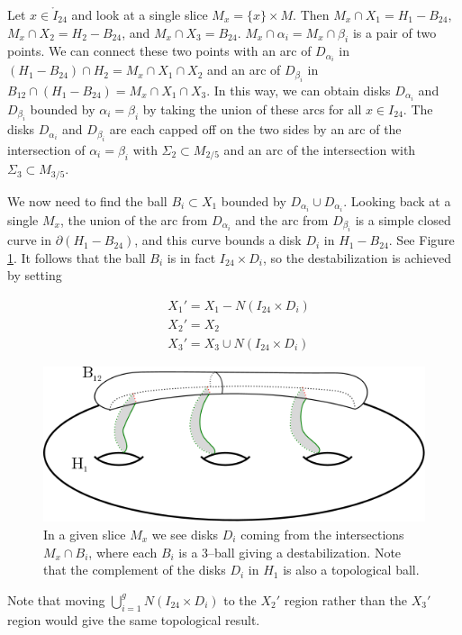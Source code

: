 \documentclass[12pt]{amsart}
\newcommand{\del}{\partial }
\theoremstyle{definition}
\theoremstyle{remark}
\begin{document}
Let $x \in \mathring I_{24}$ and look at a single slice $M_x = \{x\} \times M$.
Then $M_x \cap X_1 = H_1 - B_{24}$, $M_x \cap X_2 = H_2 - B_{24}$, and $M_x \cap X_3 = B_{24}$.
$M_x \cap \alpha_i = M_x \cap \beta_i$ is a pair of two points.
We can connect these two points with an arc of $D_{\alpha_i}$ in $(H_1 - B_{24}) \cap H_2 = M_x \cap X_1 \cap X_2$ and an arc of $D_{\beta_i}$ in $B_{12} \cap (H_1 - B_{24}) = M_x \cap X_1 \cap X_3$.
In this way, we can obtain disks $D_{\alpha_i}$ and $D_{\beta_i}$ bounded by $\alpha_i = \beta_i$ by taking the union of these arcs for all $x \in I_{24}$.
The disks $D_{\alpha_i}$ and $D_{\beta_i}$ are each capped off on the two sides by an arc of the intersection of $\alpha_i = \beta_i$ with $\Sigma_2 \subset M_{2/5}$ and an arc of the intersection with $\Sigma_3 \subset M_{3/5}$.

We now need to find the ball $B_i \subset X_1$ bounded by $D_{\alpha_i} \cup D_{\alpha_i}$.
Looking back at a single $M_x$, the union of the arc from $D_{\alpha_i}$ and the arc from $D_{\beta_i}$ is a simple closed curve in $\del (H_1 - B_{24})$, and this curve bounds a disk $D_i$ in $H_1 - B_{24}$.
See Figure \ref{getU}.
It follows that the ball $B_i$ is in fact $I_{24} \times D_i$, so the destabilization is achieved by setting

\begin{align*}
&X_1' = X_1 - N(I_{24} \times D_i) \\
&X_2' = X_2\\
&X_3' = X_3 \cup N(I_{24} \times D_i)
\end{align*}

\begin{figure}[h]
\centering
\includegraphics[height=1.8in]{gettingU.png}
\caption{In a given slice $M_x$ we see disks $D_i$ coming from the intersections $M_x \cap B_i$, where each $B_i$ is a 3--ball giving a destabilization.
Note that the complement of the disks $D_i$ in $H_1$ is also a topological ball.
}
\label{getU}
\end{figure}

Note that moving $\bigcup_{i=1}^g N(I_{24} \times D_i)$ to the $X_2'$ region rather than the $X_3'$ region would give the same topological result.
\end{document}
